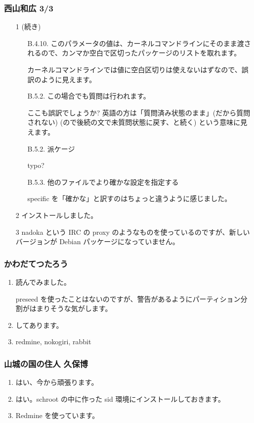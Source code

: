 \documentclass[cjk,dvipdfmx,10pt,compress,%
hyperref={bookmarks=true,bookmarksnumbered=true,bookmarksopen=false,%
colorlinks=false,%
pdftitle={第 69 回 関西 Debian 勉強会},%
pdfauthor={倉敷・のがた・佐々木・かわだ},%
pdfsubject={資料},%
}]{beamer}
\begin{document}
\begin{frame}
  \frametitle{ 西山和広 3/3 }
  \begin{enumerate}
  \item[1] (続き)
    \begin{itemize}
    \item[B.4.10.]
    このパラメータの値は、カーネルコマンドラインにそのまま渡されるので、カンマか空白で区切ったパッケージのリストを取れます。
   
    カーネルコマンドラインでは値に空白区切りは使えないはずなので、誤訳のように見えます。

    \item[B.5.2.]
    この場合でも質問は行われます。
   
    ここも誤訳でしょうか? 英語の方は「質問済み状態のまま」(だから質問されない) (ので後続の文で未質問状態に戻す、と続く) という意味に見えます。

    \item[B.5.2.]
    派ケージ
   
    typo?

    \item[B.5.3.]
    他のファイルでより確かな設定を指定する
   
    specific を「確かな」と訳すのはちょっと違うように感じました。

    \end{itemize}
  \item[2] インストールしました。
  \item[3] nadoka という IRC の proxy のようなものを使っているのですが、新しいバージョンが Debian パッケージになっていません。
  \end{enumerate}
\end{frame}

\begin{frame}
  \frametitle{ かわだてつたろう }
  \begin{enumerate}
  \item 読んでみました。

    preseed を使ったことはないのですが、警告があるようにパーティション分割がはまりそうな気がします。
  \item してあります。
  \item redmine, nokogiri, rabbit
  \end{enumerate}
\end{frame}

\begin{frame}
  \frametitle{ 山城の国の住人 久保博 }
  \begin{enumerate}
  \item はい、今から頑張ります。
  \item はい。schroot の中に作った sid 環境にインストールしておきます。
  \item Redmine を使っています。
  \end{enumerate}
\end{frame}
\end{document}
